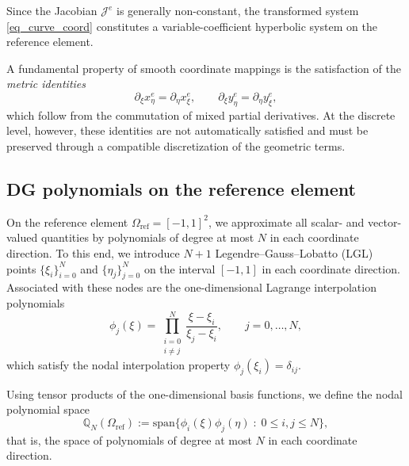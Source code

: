 \documentclass[fleqn,11pt]{amsart}
\begin{document}
Since the Jacobian $\mathcal J^{e}$ is generally non-constant, the transformed system
\eqref{eq_curve_coord} constitutes a variable-coefficient hyperbolic system on the reference element.

A fundamental property of smooth coordinate mappings is the satisfaction of the
\emph{metric identities}
\begin{equation}
\partial_{\xi}x^{e}_{\eta}=\partial_{\eta}x^{e}_{\xi},
\qquad
\partial_{\xi}y^{e}_{\eta}=\partial_{\eta}y^{e}_{\xi},
\label{eq_metric_id_cont}
\end{equation}
which follow from the commutation of mixed partial derivatives.
At the discrete level, however, these identities are not automatically satisfied and must be preserved
through a compatible discretization of the geometric terms.

\subsection{DG polynomials on the reference element}
\label{subsec:dg_poly_ref}

On the reference element $\Omega_{\mathrm{ref}}=[-1,1]^2$, we approximate all scalar- and vector-valued quantities
by polynomials of degree at most $N$ in each coordinate direction.
To this end, we introduce $N+1$ Legendre--Gauss--Lobatto (LGL) points
$\{\xi_i\}_{i=0}^N$ and $\{\eta_j\}_{j=0}^N$ on the interval $[-1,1]$ in each coordinate direction.
Associated with these nodes are the one-dimensional Lagrange interpolation polynomials
\begin{equation}
\label{lgl}
\phi_j(\xi)
=
\prod_{\substack{i=0\\ i\neq j}}^N
\frac{\xi-\xi_i}{\xi_j-\xi_i},
\qquad j=0,\ldots,N,
\end{equation}
which satisfy the nodal interpolation property $\phi_j(\xi_i)=\delta_{ij}$.

Using tensor products of the one-dimensional basis functions, we define the nodal polynomial space
\begin{equation}
\label{qN}
\mathbb Q_N(\Omega_{\mathrm{ref}})
:=
\mathrm{span}\Big\{
\phi_i(\xi)\phi_j(\eta)
\;:\;
0\le i,j\le N
\Big\},
\end{equation}
that is, the space of polynomials of degree at most $N$ in each coordinate direction.
\end{document}
